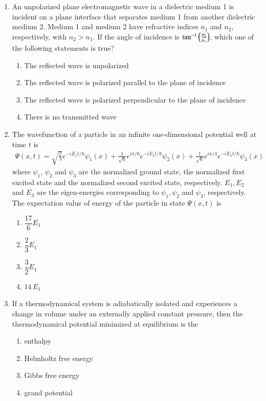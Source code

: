 \documentclass[journal,12pt,onecolumn]{IEEEtran}
\theoremstyle{remark}
\begin{document}
\begin{enumerate}
\item An unpolarized plane electromagnetic wave in a dielectric medium 1 is incident on a plane interface that separates medium 1 from another dielectric medium 2. Medium 1 and medium 2 have refractive indices $n_1$ and $n_2$, respectively, with $n_2 > n_1$. If the angle of incidence is $\tan^{-1}\left(\frac{n_2}{n_1}\right) $, which one of the following statements is true?
\begin{enumerate}
    \item The reflected wave is unpolarized
    \item The reflected wave is polarized parallel to the plane of incidence
    \item The reflected wave is polarized perpendicular to the plane of incidence
    \item There is no transmitted wave
\end{enumerate}

\item The wavefunction of a particle in an infinite one-dimensional potential well at time $t$ is
\begin{align}
\Psi(x, t) = \sqrt{\frac{2}{3}} e^{-iE_1 t/\hbar} \psi_1(x) + \frac{1}{\sqrt{6}} e^{i\pi/6} e^{-iE_2 t/\hbar} \psi_2(x) 
+ \frac{1}{\sqrt{6}} e^{i \pi/4} e^{-iE_3 t/\hbar} \psi_3(x)
\end{align}
where $\psi_1$, $\psi_2$ and $\psi_3$ are the normalized ground state, the normalized first excited state and the normalized second excited state, respectively. $E_1, E_2$ and $E_3$ are the eigen-energies corresponding to $\psi_1, \psi_2$ and $\psi_3$, respectively. The expectation value of energy of the particle in state $\Psi(x, t)$ is
\begin{enumerate}
    \item $ \dfrac{17}{6} E_1$
    \item $ \dfrac{2}{3} E_1$
    \item $\dfrac{3}{2} E_1$
    \item $14\, E_1$
\end{enumerate}

\item If a thermodynamical system is adiabatically isolated and experiences a change in volume under an externally applied constant pressure, then the thermodynamical potential minimized at equilibrium is the
\begin{enumerate}
    \item enthalpy
    \item Helmholtz free energy
    \item Gibbs free energy
    \item grand potential
\end{enumerate}


\end{enumerate}
\end{document}
